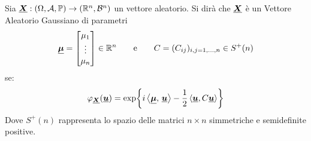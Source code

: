 \begin{definizione}
\label{def:13.1}
    Sia $\underline{{\boldsymbol{X}}}:(\Omega, \mathcal{A}, \mathbb{P})\to (\mathbb{R}^n, \mathcal{B}^n)$ un vettore aleatorio. Si dirà che $\underline{{\boldsymbol{X}}}$ è un Vettore Aleatorio Gaussiano di parametri
    \[\underline{{\boldsymbol{\mu}}}=\begin{bmatrix}\mu_1\\\vdots\\\mu_n\end{bmatrix}\in\mathbb{R}^n\qquad \text{e}\qquad C = (C_{ij})_{i, j=1, ..., n}\in S^+(n)\]
    se:
    \[\varphi_{\underline{{\boldsymbol{X}}}} (\underline{{\boldsymbol{u}}}) = \exp\!\left\{i\left\langle \underline{{\boldsymbol{\mu}}},\, \underline{{\boldsymbol{u}}} \right\rangle-\frac{1}{2}\left\langle\underline{{\boldsymbol{u}}}, C\underline{{\boldsymbol{u}}}\right\rangle \right\}\]
    \noindent Dove $S^+(n)$ rappresenta lo spazio delle matrici $n\times n$ simmetriche e semidefinite positive. 
\end{definizione}


